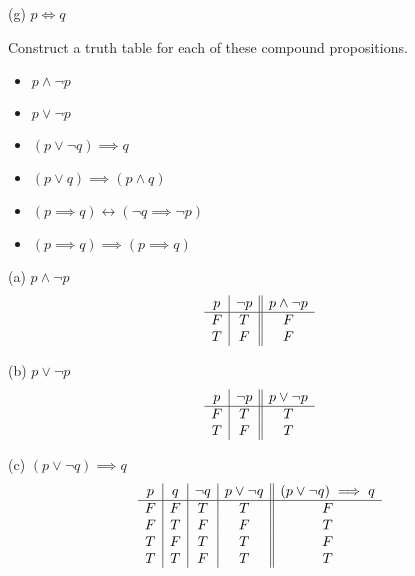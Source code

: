 \documentclass[addpoints]{exam}
\newenvironment{problem}[2][Problem]{\begin{trivlist}
    \item[\hskip \labelsep {\bfseries #1}\hskip \labelsep {\bfseries #2.}]}{\end{trivlist}}
\begin{document}
\begin{sloppypar}
\begin{questions}
\begin{solution}
        (g) $ p \iff q $
    \end{solution}
\end{questions}

\begin{problem}{3}
Construct a truth table for each of these compound propositions.
\begin{itemize}
    \item[(a)] $ p \land \neg p$
    \item[(b)] $ p \lor \neg p$
    \item[(c)] $ (p \lor \neg q) \implies  q$
    \item[(d)] $ (p \lor q) \implies (p \land q) $
    \item[(e)] $ (p \implies q) \leftrightarrow (\neg q \implies \neg p) $
    \item[(f)] $ (p \implies q) \implies (p \implies q) $
\end{itemize}

\end{problem}

\begin{questions}
    \question
    \begin{solution}

        (a) $ p \land \neg p $
        \[ 
        \begin{array}{c | c || c}
            p & \neg p & p \land \neg p \\ 
            \hline
            F & T & F \\ 
            T & F & F
        \end{array}
        \]

        (b) $ p \lor \neg p$
        \[ 
        \begin{array}{c | c || c}
            p & \neg p & p \lor \neg p \\ 
            \hline
            F & T & T \\
            T & F & T
        \end{array}
        \]

        (c) $ (p \lor \neg q) \implies  q$
        \[ 
        \begin{array}{c | c | c | c || c}
            p & q & \neg q & p \lor \neg q & (p \lor \neg q) \implies q \\ 
            \hline
            F & F & T & T & F  \\ 
            F & T & F & F & T  \\ 
            T & F & T & T & F  \\ 
            T & T & F & T & T
        \end{array}
        \]


\end{solution}
\end{questions}
\end{sloppypar}
\end{document}
